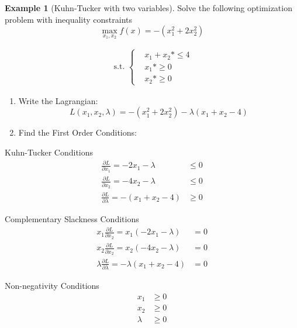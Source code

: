 \documentclass[
]{book}
\theoremstyle{definition}
\theoremstyle{definition}
\newtheorem{example}{Example}[chapter]
\theoremstyle{definition}
\theoremstyle{remark}
\begin{document}
\begin{example}[Kuhn-Tucker with two variables]
\protect\hypertarget{exm:unnamed-chunk-63}{}{\label{exm:unnamed-chunk-63} {} }Solve the following optimization problem with inequality constraints
\[\max_{x_1,x_2} f(x) = -(x_1^2 + 2x_2^2)\]

\begin{align*}
\text{ s.t. } 
\begin{cases}
&x_1 + x_2 *\le 4\\
&x_1 *\ge 0\\
&x_2 *\ge 0
\end{cases}
\end{align*}
\end{example}

\begin{enumerate}
\def\labelenumi{\arabic{enumi}.}
\item
  Write the Lagrangian:
  \[L(x_1, x_2, \lambda) =  -(x_1^2 + 2x_2^2) - \lambda(x_1 + x_2 - 4)\]
\item
  Find the First Order Conditions:
\end{enumerate}

Kuhn-Tucker Conditions
\begin{align*}
\frac{\partial L}{\partial x_1} = -2x_1 - \lambda  &\leq 0\\
\frac{\partial L}{\partial x_2}  = -4x_2 - \lambda & \leq  0\\
\frac{\partial L}{\partial \lambda} = -(x_1 + x_2 - 4)& \geq 0
\end{align*}

Complementary Slackness Conditions
\begin{align*}
x_1\frac{\partial L}{\partial x_2} = x_1(-2x_1 - \lambda)  &= 0\\
x_2\frac{\partial L}{\partial x_2} = x_2(-4x_2 - \lambda)  &= 0\\
\lambda\frac{\partial L}{\partial \lambda} = -\lambda(x_1 + x_2 - 4)&= 0
\end{align*}

Non-negativity Conditions
\begin{align*}
x_1 & \geq  0\\
x_2 & \geq 0\\
\lambda & \geq 0
\end{align*}
\end{document}
